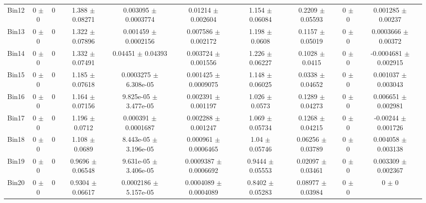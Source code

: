 \begin{tabular}{@{\extracolsep{4pt}}lccccccccc@{}}
     Bin12 & 0 $\pm$ 0 & 0 & 1.388 $\pm$ 0.08271 & 0.003095 $\pm$ 0.0003774 & 0.01214 $\pm$ 0.002604 & 1.154 $\pm$ 0.06084 & 0.2209 $\pm$ 0.05593 & 0 $\pm$ 0 & 0.001285 $\pm$ 0.00237 \\ 
     Bin13 & 0 $\pm$ 0 & 0 & 1.322 $\pm$ 0.07896 & 0.001459 $\pm$ 0.0002156 & 0.007586 $\pm$ 0.002172 & 1.198 $\pm$ 0.0608 & 0.1157 $\pm$ 0.05019 & 0 $\pm$ 0 & 0.0003666 $\pm$ 0.00372 \\ 
     Bin14 & 0 $\pm$ 0 & 0 & 1.332 $\pm$ 0.07491 & 0.04451 $\pm$ 0.04393 & 0.003724 $\pm$ 0.001556 & 1.226 $\pm$ 0.06227 & 0.1028 $\pm$ 0.0415 & 0 $\pm$ 0 & -0.0004681 $\pm$ 0.002915 \\ 
     Bin15 & 0 $\pm$ 0 & 0 & 1.185 $\pm$ 0.07618 & 0.0003275 $\pm$ 6.308e-05 & 0.001425 $\pm$ 0.0009075 & 1.148 $\pm$ 0.06025 & 0.0338 $\pm$ 0.04652 & 0 $\pm$ 0 & 0.001037 $\pm$ 0.003043 \\ 
     Bin16 & 0 $\pm$ 0 & 0 & 1.164 $\pm$ 0.07156 & 9.825e-05 $\pm$ 3.477e-05 & 0.002391 $\pm$ 0.001197 & 1.026 $\pm$ 0.0573 & 0.1289 $\pm$ 0.04273 & 0 $\pm$ 0 & 0.006651 $\pm$ 0.002981 \\ 
     Bin17 & 0 $\pm$ 0 & 0 & 1.196 $\pm$ 0.0712 & 0.000391 $\pm$ 0.0001687 & 0.002288 $\pm$ 0.001247 & 1.069 $\pm$ 0.05734 & 0.1268 $\pm$ 0.04215 & 0 $\pm$ 0 & -0.00244 $\pm$ 0.001726 \\ 
     Bin18 & 0 $\pm$ 0 & 0 & 1.108 $\pm$ 0.0689 & 8.443e-05 $\pm$ 3.196e-05 & 0.000961 $\pm$ 0.0006465 & 1.04 $\pm$ 0.05746 & 0.06256 $\pm$ 0.03789 & 0 $\pm$ 0 & 0.004058 $\pm$ 0.003138 \\ 
     Bin19 & 0 $\pm$ 0 & 0 & 0.9696 $\pm$ 0.06548 & 9.631e-05 $\pm$ 3.406e-05 & 0.0009387 $\pm$ 0.0006692 & 0.9444 $\pm$ 0.05553 & 0.02097 $\pm$ 0.03461 & 0 $\pm$ 0 & 0.003309 $\pm$ 0.002367 \\ 
     Bin20 & 0 $\pm$ 0 & 0 & 0.9304 $\pm$ 0.06617 & 0.0002186 $\pm$ 5.157e-05 & 0.0004089 $\pm$ 0.0004089 & 0.8402 $\pm$ 0.05283 & 0.08977 $\pm$ 0.03984 & 0 $\pm$ 0 & 0 $\pm$ 0 \\ 
\hline\hline
  \end{tabular}
